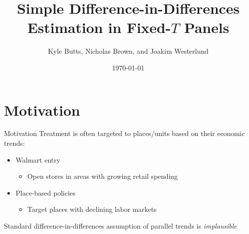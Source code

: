 \documentclass[aspectratio=169,t,11pt,table]{beamer}
\title{Simple Difference-in-Differences Estimation in Fixed-$T$ Panels}
\date{\today}
\author{Kyle Butts, Nicholas Brown, and Joakim Westerlund}
\begin{document}
\begin{frame}
  \maketitle
\end{frame}

\section{Motivation}

\begin{frame}{Motivation}
  Treatment is often targeted to places/units based on their economic trends:

  \begin{itemize}    

    \pause
    \item Walmart entry \citep{basker2005job,neumark2008effects}
    \begin{itemize}
      \item Open stores in areas with growing retail spending
    \end{itemize}

    \pause
    \item Place-based policies \citep{neumark2015place}
    \begin{itemize}
      \item Target places with declining labor markets 
    \end{itemize}
  \end{itemize}

  \bigskip\pause
  Standard difference-in-differences assumption of parallel trends is \emph{implausible}
\end{frame}
\end{document}
